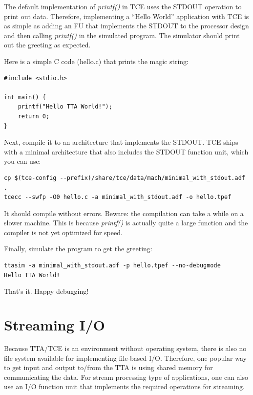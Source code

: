\documentclass[twoside]{tceusermanual}
\begin{document}
The default implementation of \textit{printf()} in TCE uses the STDOUT
operation to print out data. Therefore, implementing a ``Hello World''
application with TCE is as simple as adding an FU that implements
the STDOUT to the processor design and then calling \textit{printf()} in
the simulated program. The simulator should print out the greeting
as expected.

Here is a simple C code (hello.c) that prints the magic string:

\begin{verbatim}
#include <stdio.h>

int main() {
    printf("Hello TTA World!");
    return 0;
}
\end{verbatim}

Next, compile it to an architecture that implements the
STDOUT. TCE ships with a minimal architecture that also includes
the STDOUT function unit, which you can use:

\begin{verbatim}
cp $(tce-config --prefix)/share/tce/data/mach/minimal_with_stdout.adf .
tcecc --swfp -O0 hello.c -a minimal_with_stdout.adf -o hello.tpef
\end{verbatim}


It should compile without errors. Beware: the compilation can take
a while on a slower machine. This is because \textit{printf()} 
is actually quite a large function and the compiler is not yet optimized for 
speed.

Finally, simulate the program to get the greeting:

\begin{verbatim}
ttasim -a minimal_with_stdout.adf -p hello.tpef --no-debugmode
Hello TTA World!
\end{verbatim}

That's it. Happy debugging!

\section{Streaming I/O}
\label{section:streamIO}

Because TTA/TCE is an environment without operating system, there is also
no file system available for implementing file-based I/O. Therefore, one
popular way to get input and output to/from the TTA is using shared memory
for communicating the data. For stream processing type of applications,
one can also use an I/O function unit that implements the required 
operations for streaming.
\end{document}
